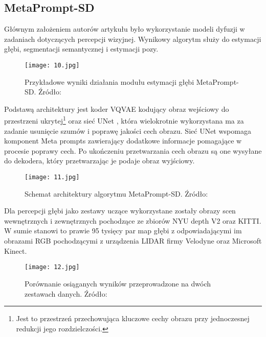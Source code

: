 \subsection{MetaPrompt-SD}
Głównym założeniem autorów artykułu \cite{wan2023} było wykorzystanie modeli dyfuzji w zadaniach dotyczących percepcji wizyjnej. Wynikowy algorytm służy do estymacji głębi, segmentacji semantycznej i estymacji pozy.
\begin{figure}[H]
    \centering
    \texttt{[image: 10.jpg]}
    \caption{Przykładowe wyniki działania modułu estymacji głębi MetaPrompt-SD. Źródło: \cite{wan2023}}
    \label{fig:metaprompt-sd}
\end{figure}
Podstawą architektury jest koder VQVAE \cite{oord2018} kodujący obraz wejściowy do przestrzeni ukrytej\footnote{Jest to przestrzeń przechowująca kluczowe cechy obrazu przy jednoczesnej redukcji jego rozdzielczości.} oraz sieć UNet \cite{ronneberger2015}, która wielokrotnie wykorzystana ma za zadanie usunięcie szumów i poprawę jakości cech obrazu. Sieć UNet wspomaga komponent Meta prompts zawierający dodatkowe informacje pomagające w procesie poprawy cech. Po ukończeniu przetwarzania cech obrazu są one wysyłane do dekodera, który przetwarzając je podaje obraz wyjściowy.
\begin{figure}[H]
    \centering
    \texttt{[image: 11.jpg]}
    \caption{Schemat architektury algorytmu MetaPrompt-SD. Źródło: \cite{wan2023}}
    \label{fig:metaprompt-sd-schema}
\end{figure}
Dla percepcji głębi jako zestawy uczące wykorzystane zostały obrazy scen wewnętrznych i zewnętrznych pochodzące ze zbiorów NYU depth V2 oraz KITTI. W sumie stanowi to prawie 95 tysięcy par map głębi z odpowiadającymi im obrazami RGB pochodzącymi z urządzenia LIDAR firmy Velodyne oraz Microsoft Kinect.
\begin{figure}[H]
    \centering
    \texttt{[image: 12.jpg]}
    \caption{Porównanie osiąganych wyników przeprowadzone na dwóch zestawach danych. Źródło: \cite{wan2023}}
    \label{fig:metaprompt-sd-results}
\end{figure}

